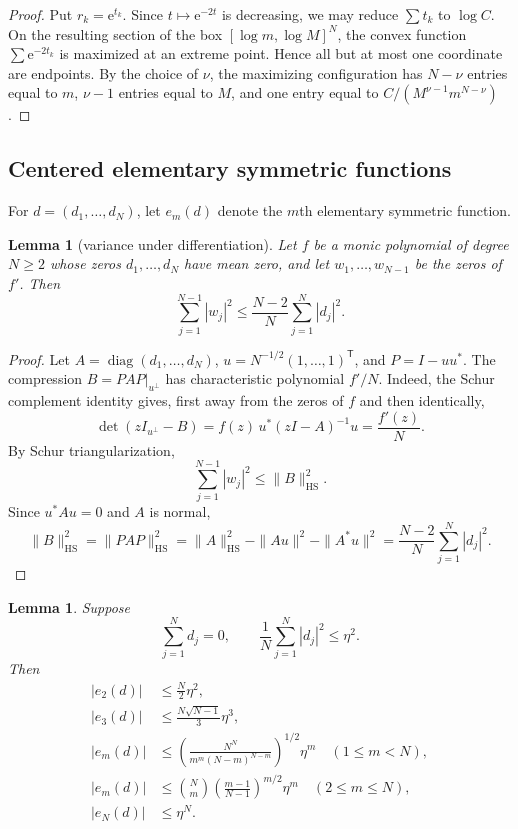 \documentclass[11pt]{article}
\newtheorem{lemma}[theorem]{Lemma}
\theoremstyle{remark}
\newcommand{\e}{\mathrm e}
\begin{document}
\begin{proof}
Put $r_k=\e^{t_k}$.  Since $t\mapsto\e^{-2t}$ is decreasing, we may reduce
$\sum t_k$ to $\log C$.  On the resulting section of the box
$[\log m,\log M]^N$, the convex function $\sum\e^{-2t_k}$ is maximized at an
extreme point.  Hence all but at most one coordinate are endpoints.  By the
choice of $\nu$, the maximizing configuration has $N-\nu$ entries equal to
$m$, $\nu-1$ entries equal to $M$, and one entry equal to
$C/(M^{\nu-1}m^{N-\nu})$.
\end{proof}

\subsection{Centered elementary symmetric functions}

For $d=(d_1,\ldots,d_N)$, let $e_m(d)$ denote the $m$th elementary symmetric
function.

\begin{lemma}[variance under differentiation]\label{lem:variance-derivative}
Let $f$ be a monic polynomial of degree $N\ge2$ whose zeros
$d_1,\ldots,d_N$ have mean zero, and let $w_1,\ldots,w_{N-1}$ be the zeros of
$f'$.  Then
\[
 \sum_{j=1}^{N-1}|w_j|^2
 \le \frac{N-2}{N}\sum_{j=1}^N|d_j|^2.
\]
\end{lemma}

\begin{proof}
Let $A=\operatorname{diag}(d_1,\ldots,d_N)$,
$u=N^{-1/2}(1,\ldots,1)^{\mathsf T}$, and $P=I-uu^*$.  The compression
$B=PAP|_{u^\perp}$ has characteristic polynomial $f'/N$.  Indeed, the Schur
complement identity gives, first away from the zeros of $f$ and then
identically,
\[
 \det(zI_{u^\perp}-B)
 =f(z)\,u^*(zI-A)^{-1}u
 =\frac{f'(z)}N.
\]
By Schur triangularization,
\[
 \sum_{j=1}^{N-1}|w_j|^2\le \|B\|_{\mathrm{HS}}^2.
\]
Since $u^*Au=0$ and $A$ is normal,
\[
 \|B\|_{\mathrm{HS}}^2
 =\|PAP\|_{\mathrm{HS}}^2
 =\|A\|_{\mathrm{HS}}^2-\|Au\|^2-\|A^*u\|^2
 =\frac{N-2}{N}\sum_{j=1}^N|d_j|^2.
\]
\end{proof}

\begin{lemma}\label{lem:centered-esp}
Suppose
\[
 \sum_{j=1}^N d_j=0,
 \qquad
 \frac1N\sum_{j=1}^N|d_j|^2\le \eta^2.
\]
Then
\begin{align}
 |e_2(d)|&\le \frac N2\eta^2,\label{eq:e2}\\
 |e_3(d)|&\le \frac{N\sqrt{N-1}}3\eta^3,\label{eq:e3}\\
 |e_m(d)|&\le
 \left(\frac{N^N}{m^m(N-m)^{N-m}}\right)^{1/2}\eta^m
 \quad(1\le m<N),\label{eq:cauchy-esp}\\
 |e_m(d)|&\le \binom Nm
 \left(\frac{m-1}{N-1}\right)^{m/2}\eta^m
 \quad(2\le m\le N),\label{eq:schoenberg}\\
 |e_N(d)|&\le \eta^N.\label{eq:topesp}
\end{align}
\end{lemma}
\end{document}
